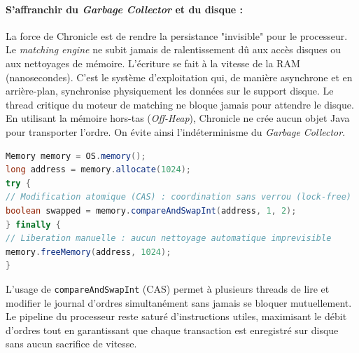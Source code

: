 \paragraph{S'affranchir du \textit{Garbage Collector} et du disque :}

La force de Chronicle est de rendre la persistance "invisible" pour le processeur. Le \textit{matching engine} ne subit jamais de ralentissement dû aux accès disques ou aux nettoyages de mémoire. L'écriture se fait à la vitesse de la RAM (nanosecondes). C'est le système d'exploitation qui, de manière asynchrone et en arrière-plan, synchronise physiquement les données sur le support disque. Le thread critique du moteur de matching ne bloque jamais pour attendre le disque. En utilisant la mémoire hors-tas (\textit{Off-Heap}), Chronicle ne crée aucun objet Java pour transporter l'ordre. On évite ainsi l'indéterminisme du \textit{Garbage Collector}.

\begin{lstlisting}[language=Java, caption=Gestion deterministe et atomique]
Memory memory = OS.memory();
long address = memory.allocate(1024);
try {
// Modification atomique (CAS) : coordination sans verrou (lock-free)
boolean swapped = memory.compareAndSwapInt(address, 1, 2);
} finally {
// Liberation manuelle : aucun nettoyage automatique imprevisible
memory.freeMemory(address, 1024);
}
\end{lstlisting}

L'usage de \texttt{compareAndSwapInt} (CAS) permet à plusieurs threads de lire et modifier le journal d'ordres simultanément sans jamais se bloquer mutuellement. Le pipeline du processeur reste saturé d'instructions utiles, maximisant le débit d'ordres tout en garantissant que chaque transaction est enregistré sur disque sans aucun sacrifice de vitesse.